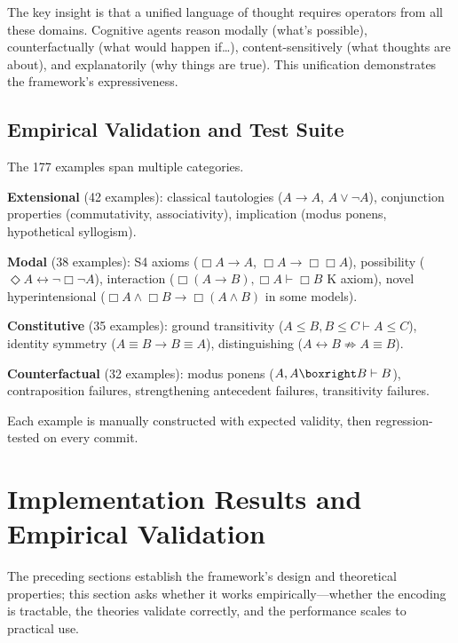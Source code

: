 \documentclass[pdflatex,sn-mathphys-num]{sn-jnl}
\newcommand{\nec}{\Box}                     %
\newcommand{\poss}{\Diamond}                %
\newcommand{\imp}{\to}                      %
\newcommand{\lneg}{\neg}                    %
\newcommand{\ground}{\leq}                  %
\newcommand{\propident}{\equiv}             %
\theoremstyle{thmstyleone}
\theoremstyle{thmstyletwo}
\theoremstyle{thmstylethree}
\begin{document}
The key insight is that a unified language of thought requires operators from all these domains.
Cognitive agents reason modally (what's possible), counterfactually (what would happen if\ldots), content-sensitively (what thoughts are about), and explanatorily (why things are true).
This unification demonstrates the framework's expressiveness.

\subsection{Empirical Validation and Test Suite}\label{sec:validation}

The 177 examples span multiple categories.

\textbf{Extensional} (42 examples): classical tautologies ($A \imp A$, $A \lor \lneg A$), conjunction properties (commutativity, associativity), implication (modus ponens, hypothetical syllogism).

\textbf{Modal} (38 examples): S4 axioms ($\nec A \imp A$, $\nec A \imp \nec \nec A$), possibility ($\poss A \leftrightarrow \lneg \nec \lneg A$), interaction ($\nec(A \imp B), \nec A \vdash \nec B$ K axiom), novel hyperintensional ($\nec A \land \nec B \imp \nec(A \land B)$ in some models).

\textbf{Constitutive} (35 examples): ground transitivity ($A \ground B, B \ground C \vdash A \ground C$), identity symmetry ($A \propident B \imp B \propident A$), distinguishing ($A \leftrightarrow B \not\Rightarrow A \propident B$).

\textbf{Counterfactual} (32 examples): modus ponens ($A, A \boxright B \vdash B$), contraposition failures, strengthening antecedent failures, transitivity failures.

Each example is manually constructed with expected validity, then regression-tested on every commit.


\section{Implementation Results and Empirical Validation}\label{sec:results}

The preceding sections establish the framework's design and theoretical properties; this section asks whether it works empirically---whether the encoding is tractable, the theories validate correctly, and the performance scales to practical use.
\end{document}
